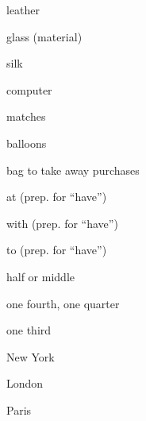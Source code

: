\documentclass[avery5371,grid,frame]{flashcards}
\begin{document}
\begin{flashcard}{\LARGE leather}
\LARGE {}
\end{flashcard}
\begin{flashcard}{\LARGE glass (material)}
\LARGE {}
\end{flashcard}
\begin{flashcard}{\LARGE silk}
\LARGE {}
\end{flashcard}
\begin{flashcard}{\LARGE computer}
\LARGE {}
\end{flashcard}
\begin{flashcard}{\LARGE matches}
\LARGE {}
\end{flashcard}
\begin{flashcard}{\LARGE balloons}
\LARGE {}
\end{flashcard}
\begin{flashcard}{\LARGE bag to take away purchases}
\LARGE {}
\end{flashcard}
\begin{flashcard}{\LARGE at (prep. for ``have'')}
\LARGE {}
\end{flashcard}
\begin{flashcard}{\LARGE with (prep. for ``have'')}
\LARGE {}
\end{flashcard}
\begin{flashcard}{\LARGE to (prep. for ``have'')}
\LARGE {}
\end{flashcard}
\begin{flashcard}{\LARGE half or middle}
\LARGE {}
\end{flashcard}
\begin{flashcard}{\LARGE one fourth, one quarter}
\LARGE {}
\end{flashcard}
\begin{flashcard}{\LARGE one third}
\LARGE {}
\end{flashcard}
\begin{flashcard}{\LARGE New York}
\LARGE {}
\end{flashcard}
\begin{flashcard}{\LARGE London}
\LARGE {}
\end{flashcard}
\begin{flashcard}{\LARGE Paris}
\LARGE {}
\end{flashcard}
\end{document}

